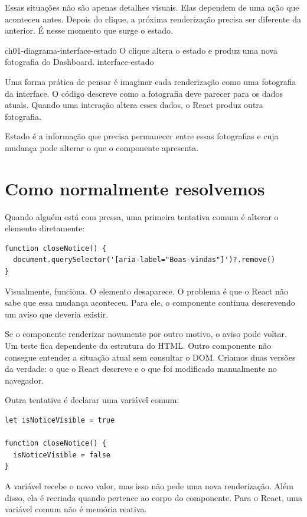 Essas situações não são apenas detalhes visuais. Elas dependem de uma ação que
aconteceu antes. Depois do clique, a próxima renderização precisa ser diferente
da anterior. É nesse momento que surge o estado.

\imagemcapitulo
  {ch01-diagrama-interface-estado}
  {O clique altera o estado e produz uma nova fotografia do Dashboard.}
  {interface-estado}

Uma forma prática de pensar é imaginar cada renderização como uma fotografia da
interface. O código descreve como a fotografia deve parecer para os dados
atuais. Quando uma interação altera esses dados, o React produz outra
fotografia.

Estado é a informação que precisa permanecer entre essas fotografias e cuja
mudança pode alterar o que o componente apresenta.

\section{Como normalmente resolvemos}

Quando alguém está com pressa, uma primeira tentativa comum é alterar o elemento
diretamente:

\begin{lstlisting}[caption={Uma solução que contorna o React.}]
function closeNotice() {
  document.querySelector('[aria-label="Boas-vindas"]')?.remove()
}
\end{lstlisting}

Visualmente, funciona. O elemento desaparece. O problema é que o React não sabe
que essa mudança aconteceu. Para ele, o componente continua descrevendo um
aviso que deveria existir.

Se o componente renderizar novamente por outro motivo, o aviso pode voltar. Um
teste fica dependente da estrutura do HTML. Outro componente não consegue
entender a situação atual sem consultar o DOM. Criamos duas versões da verdade:
o que o React descreve e o que foi modificado manualmente no navegador.

Outra tentativa é declarar uma variável comum:

\begin{lstlisting}[caption={A variável muda, mas a interface não reage.}]
let isNoticeVisible = true

function closeNotice() {
  isNoticeVisible = false
}
\end{lstlisting}

A variável recebe o novo valor, mas isso não pede uma nova renderização. Além
disso, ela é recriada quando pertence ao corpo do componente. Para o React,
uma variável comum não é memória reativa.

